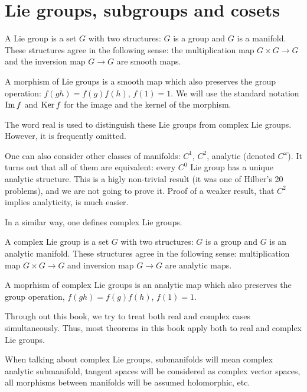 \section{Lie groups, subgroups and cosets}
\begin{definition}
  A Lie group is a set $G$ with two structures: $G$ is a group and $G$ is a
  manifold. These structures agree in the following sense: the
  multiplication map $G\times G\to G$ and the inversion map $G\to G$ are
  smooth maps.
\end{definition}

A morphism of Lie groups is a smooth map which also preserves the group
operation: $f(gh)=f(g)f(h)$, $f(1)=1$. We will use the standard notation
$\operatorname{Im} f$ and $\operatorname{Ker} f$ for the image and the kernel of the morphism.

The word real is used to distinguish these Lie groups from complex Lie
groups. However, it is frequently omitted.

One can also consider other classes of manifolds: $C^1$, $C^2$, analytic
(denoted $C^\omega$). It turns out that all of them are equivalent: every
$C^0$ Lie group has a unique analytic structure. This is a higly
non-trivial result (it was one of Hilber's 20 problems), and we are not
going to prove it. Proof of a weaker result, that $C^2$ implies
analyticity, is much easier.

In a similar way, one defines complex Lie groups.

\begin{definition}
  A complex Lie group is a set $G$ with two structures: $G$ is a group and
  $G$ is an analytic manifold. These structures agree in the following
  sense: multiplication map $G\times G\to G$ and inversion map $G\to G$ are
  analytic maps.
\end{definition}

A moprhism of complex Lie groups is an analytic map which also preserves
the group operation, $f(gh)=f(g)f(h)$, $f(1)=1$.

Through out this book, we try to treat both real and complex cases
simultaneously. Thus, most theorems in this book apply both to real and
complex Lie groups.

When talking about complex Lie groups, submanifolds will mean complex
analytic submanifold, tangent spaces will be considered as complex vector
spaces, all morphisms between manifolds will be assumed holomorphic, etc.

